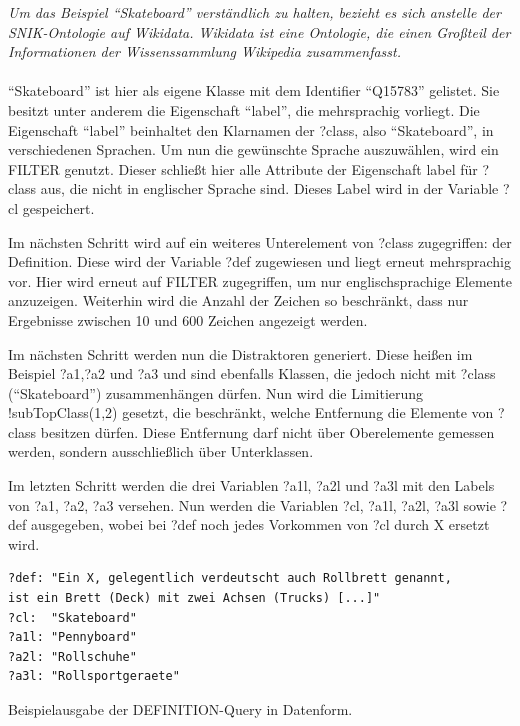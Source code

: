 \documentclass[headsepline,titlepage,ngerman,twoside,12pt]{report}
\begin{document}
\textit{Um das Beispiel \enquote{Skateboard} verständlich zu halten, bezieht es sich anstelle der SNIK-Ontologie auf Wikidata.
Wikidata ist eine Ontologie, die einen Großteil der Informationen der Wissenssammlung Wikipedia zusammenfasst.}\\\\

\enquote{Skateboard} ist hier als eigene Klasse mit dem Identifier \enquote{Q15783} gelistet. Sie besitzt unter anderem die Eigenschaft \enquote{label}, die mehrsprachig vorliegt.
Die Eigenschaft \enquote{label} beinhaltet den Klarnamen der ?class, also \enquote{Skateboard}, in verschiedenen Sprachen. 
Um nun die gewünschte Sprache auszuwählen, wird ein FILTER genutzt.
Dieser schließt hier alle Attribute der Eigenschaft label für ?class aus, die nicht in englischer Sprache sind.
Dieses Label wird in der Variable ?cl gespeichert.

Im nächsten Schritt wird auf ein weiteres Unterelement von ?class zugegriffen: der Definition.
Diese wird der Variable ?def zugewiesen und liegt erneut mehrsprachig vor.
Hier wird erneut auf FILTER zugegriffen, um nur englischsprachige Elemente anzuzeigen.
Weiterhin wird die Anzahl der Zeichen so beschränkt, dass nur Ergebnisse zwischen 10 und 600 Zeichen angezeigt werden.

Im nächsten Schritt werden nun die Distraktoren generiert.
Diese heißen im Beispiel ?a1,?a2 und ?a3 und sind ebenfalls Klassen, die jedoch nicht mit ?class (\enquote{Skateboard}) zusammenhängen dürfen.
Nun wird die Limitierung !subTopClass(1,2) gesetzt, die beschränkt, welche Entfernung die Elemente von ?class besitzen dürfen.
Diese Entfernung darf nicht über Oberelemente gemessen werden, sondern ausschließlich über Unterklassen. 

Im letzten Schritt werden die drei Variablen ?a1l, ?a2l und ?a3l mit den Labels von ?a1, ?a2, ?a3 versehen.
Nun werden die Variablen ?cl, ?a1l, ?a2l, ?a3l sowie ?def ausgegeben, wobei bei ?def noch jedes Vorkommen von ?cl durch X ersetzt wird.

\begin{table}
\begin{centering}
\begin{lstlisting}
?def: "Ein X, gelegentlich verdeutscht auch Rollbrett genannt,
ist ein Brett (Deck) mit zwei Achsen (Trucks) [...]"
?cl:  "Skateboard"
?a1l: "Pennyboard"
?a2l: "Rollschuhe"
?a3l: "Rollsportgeraete"
\end{lstlisting}
\end{centering}
\caption{Beispielausgabe der DEFINITION-Query in Datenform.}
\label{tab:sparqldefinitionexampledata}
\end{table}
\end{document}
